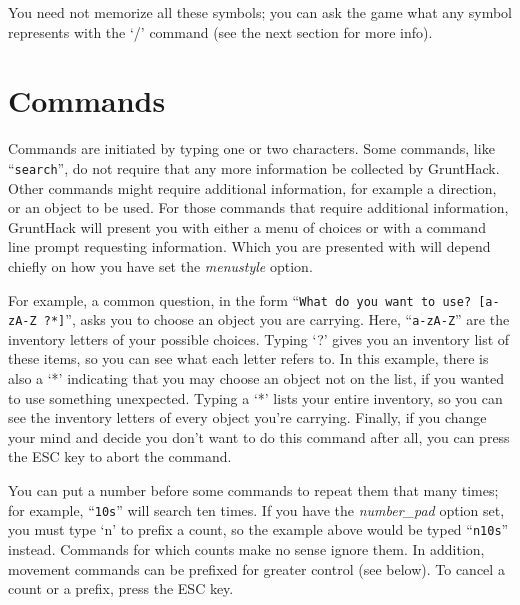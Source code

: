 You need not memorize all these symbols; you can ask the game what any
symbol represents with the `/' command (see the next section for
more info).

\section{Commands}

Commands are initiated by typing one or two characters.  Some commands,
like ``{\tt search}'', do not require that any more information be collected by
GruntHack.  Other commands might require additional information, for
example a direction, or an object to be used.  For those commands that
require additional information, GruntHack will present you with either a
menu of choices or with a command line prompt requesting information.  Which
you are presented with will depend chiefly on how you have set the
{\it menustyle }
option.

For example, a common question, in the form ``{\tt What do you want to
use? [a-zA-Z\ ?*]}'', asks you to choose an object you are carrying.
Here, ``{\tt a-zA-Z}'' are the inventory letters of your possible choices.
Typing `?' gives you an inventory list of these items, so you can see
what each letter refers to.  In this example, there is also a `*'
indicating that you may choose an object not on the list, if you
wanted to use something unexpected.  Typing a `*' lists your entire
inventory, so you can see the inventory letters of every object you're
carrying.  Finally, if you change your mind and decide you don't want
to do this command after all, you can press the ESC key to abort the
command.

You can put a number before some commands to repeat them that many
times; for example, ``{\tt 10s}'' will search ten times.  If you have the
{\it number\_pad }
option set, you must type `n' to prefix a count, so the example above
would be typed ``{\tt n10s}'' instead.  Commands for which counts make no
sense ignore them.  In addition, movement commands can be prefixed for
greater control (see below).  To cancel a count or a prefix, press the
ESC key.

